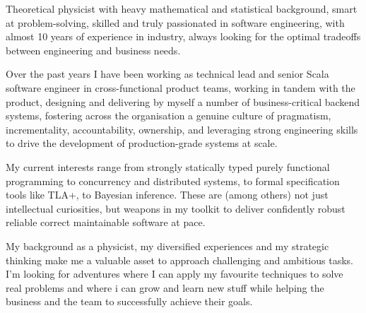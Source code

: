 
\begin{cvparagraph}
Theoretical physicist with heavy mathematical and statistical 
background, smart at problem-solving, skilled and truly passionated in software engineering, with almost 10 years of experience in industry, always looking for the optimal tradeoffs between engineering and business needs.

  Over the past years I have been working as technical lead and senior Scala software engineer in cross-functional product teams, working in tandem with the product, designing and delivering by myself a number of business-critical backend systems, fostering  across the organisation a genuine culture of pragmatism, incrementality, accountability, ownership, and leveraging strong engineering skills 
  to drive the development of production-grade systems at scale. 

  My current interests range from strongly statically typed purely functional programming to concurrency and distributed systems, to formal specification tools like TLA+, to Bayesian inference. These are (among others) not just intellectual curiosities, but weapons in my toolkit to deliver confidently robust reliable correct maintainable software at pace. 

My background as a physicist, my diversified experiences and my strategic thinking make me a valuable asset to approach challenging and ambitious tasks. I'm looking for adventures where I can apply my favourite techniques to solve real problems and where i can grow and learn new stuff while helping the business and the team to successfully achieve their goals. 
\end{cvparagraph}
